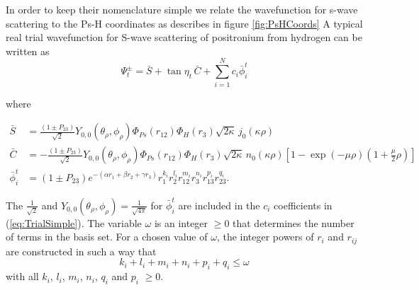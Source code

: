 \documentclass[preprint,showpacs,preprintnumbers,amsmath,amssymb]{revtex4}
\newcommand{\beq}{\begin{equation}}
\newcommand{\eeq}{\end{equation}}
\begin{document}
In order to keep their nomenclature simple we relate the wavefunction for s-wave scattering to the Ps-H coordinates as describes in figure \ref{fig:PsHCoords}
A typical real trial wavefunction for S-wave scattering of positronium from hydrogen can be written as
\begin{equation}
\Psi_t^\pm = \bar{S} + \tan \eta_t \, \bar{C} + \sum_{i=1}^N c_i \bar{\phi}_i^t
\label{eq:TrialSimple}
\end{equation}

\noindent where

\begin{subequations}\label{eq:SCPhiDef}
\begin{align}
\bar{S} &= \frac{\left( 1 \pm P_{23} \right)}{\sqrt{2}} Y_{0,0}\left( \theta_\rho, \phi_\rho \right) \Phi_{Ps}\left(r_{12}\right) \Phi_H\left(r_3\right) \sqrt{2\kappa} \,j_0\!\left(\kappa\rho\right) \label{eq:SDef} \\
\bar{C} &= -\frac{\left( 1 \pm P_{23} \right)}{\sqrt{2}} Y_{0,0}\left( \theta_\rho, \phi_\rho \right) \Phi_{Ps}\left(r_{12}\right) \Phi_H\left(r_3\right) \sqrt{2\kappa} \,n_0\!\left(\kappa\rho\right) \left[1 - \exp(-\mu \rho) (1+\frac{\mu}{2}\rho)\right] \label{eq:CDef} \\
\bar{\phi}_i^t &= \left( 1 \pm P_{23} \right) e^{-\left(\alpha r_1 + \beta r_2 + \gamma r_3 \right)} r_1^{k_i} r_2^{l_i} r_{12}^{m_i} r_3^{n_i} r_{13}^{p_i} r_{23}^{q_i}. \label{eq:PhiDef}
\end{align}
\end{subequations}

\noindent The $\frac{1}{\sqrt{2}}$ and $Y_{0,0}\left( \theta_\rho, \phi_\rho \right) = \frac{1}{\sqrt{4\pi}}$ for $\bar{\phi}_i^t$ are included in the $c_i$ coefficients in (\ref{eq:TrialSimple}).
The variable $\omega$ is an integer $\geq 0$ that determines the number of terms in the basis set.  For a chosen value of $\omega$, the integer powers of $r_i$ and $r_{ij}$ are constructed in such a way that
\beq
k_i + l_i + m_i + n_i + p_i + q_i \leq \omega
\eeq
\noindent with all $k_i$, $l_i$, $m_i$, $n_i$, $q_i$ and $p_i$ $\geq 0$.




\end{document}
